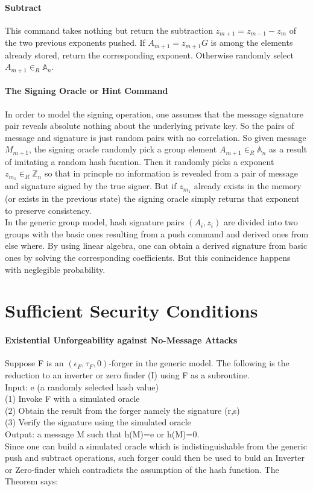 \documentclass[12]{article}
\begin{document}
\paragraph{Subtract}
This command takes nothing but return the subtraction $z_{m+1}=z_{m-1}-z_m$ of the two previous exponents pushed. If $A_{m+1}=z_{m+1}G$ is among the elements already stored, return the corresponding exponent. Otherwise randomly select $A_{m+1} \in _R \mathbb{A}_n$.
\paragraph{The Signing Oracle or Hint Command}
In order to model the signing operation, one assumes that the message signature pair reveals absolute nothing about the underlying private key. So the pairs of message and signature is just random pairs with no correlation. So given message $M_{m+1}$, the signing oracle randomly pick a group element $A_{m+1}\in _R\mathbb{A}_n$ as a result of imitating a random hash fucntion.
Then it randomly picks a exponent $z_{m_1}\in _R\mathbb{Z}_n$ so that in princple no information is revealed from a pair of message and signature signed by the true signer. But if $z_{m_1}$ already exists in the memory (or exists in the previous state) the signing oracle simply returns that exponent to preserve consistency.\\
In the generic group model, hash signature pairs $(A_i,z_i)$ are divided into two groups with the basic ones resulting from a push command and derived ones from else where. By using linear algebra, one can obtain a derived signature from basic ones by solving the corresponding coefficients. But this conincidence happens with neglegible probability.

\section{Sufficient Security Conditions}
\paragraph{Existential Unforgeability against No-Message Attacks}
Suppose F is an $(\epsilon_F,\tau_F,0)$-forger in the generic model. The following is the reduction to an inverter or zero finder (I) using F as a subroutine.\\
Input: e (a randomly selected hash value)\\
(1) Invoke F with a simulated oracle\\
(2) Obtain the result from the forger namely the signature (r,s)\\
(3) Verify the signature using the simulated oracle\\
Output:  a message M such that h(M)=e or h(M)=0.\\
Since one can build a simulated oracle which is indistinguishable from the generic push and subtract operations, such forger could then be used to buld an Inverter or Zero-finder which contradicts the assumption of the hash function.
The Theorem says:
\end{document}
